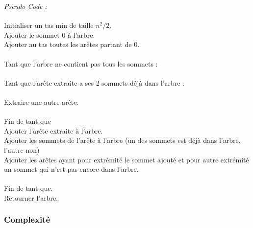 \documentclass[a4paper,11pt]{article}
\begin{document}
\textit{Pseudo Code :}\\
\\
Initialiser un tas min de taille  $n^2/2$.\\
Ajouter le sommet 0 à l'arbre.\\
Ajouter au tas toutes les arêtes partant de 0.\\
\\
Tant que l'arbre ne contient pas tous les sommets :\\
\\
\hspace*{1cm}Tant que l'arête extraite a ses 2 sommets déjà dans l'arbre :\\
\\
\hspace*{2cm}Extraire une autre arête.\\
\\
\hspace*{1cm}Fin de tant que\\
\hspace*{1cm}Ajouter l'arête extraite à l'arbre.\\
\hspace*{1cm}Ajouter les sommets de l'arête à l'arbre (un des sommets est déjà dans l'arbre, l'autre non)\\
\hspace*{1cm}Ajouter les arêtes ayant pour extrémité le sommet ajouté et pour autre extrémité un sommet qui n'est pas encore dans l'arbre.\\
\\
Fin de tant que.\\
Retourner l'arbre.\\

\subsubsection*{Complexité}
\end{document}
